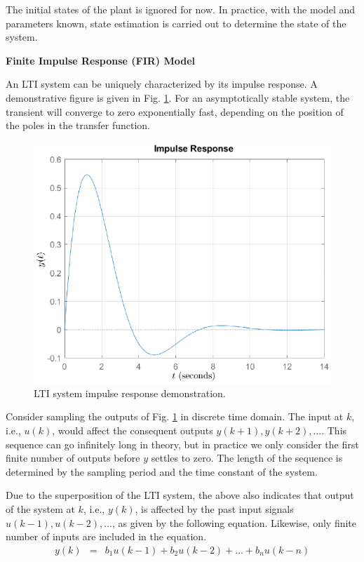 The initial states of the plant is ignored for now. In practice, with the model and parameters known, state estimation is carried out to determine the state of the system.

\vspace{0.1in}
\noindent \textbf{Finite Impulse Response (FIR) Model}
\vspace{0.1in}

An LTI system can be uniquely characterized by its impulse response. A demonstrative figure is given in Fig. \ref{ch:acs:fig:impulse_second_demo}. For an asymptotically stable system, the transient will converge to zero exponentially fast, depending on the position of the poles in the transfer function.
\begin{figure}
	\centering
	\includegraphics[width=350pt]{chapters/ch-adaptive-control-system/figures/impulse_second_demo.eps}
	\caption{LTI system impulse response demonstration.} \label{ch:acs:fig:impulse_second_demo}
\end{figure}

Consider sampling the outputs of Fig. \ref{ch:acs:fig:impulse_second_demo} in discrete time domain. The input at $k$, i.e., $u(k)$, would affect the consequent outputs $y(k+1), y(k+2), ...$. This sequence can go infinitely long in theory, but in practice we only consider the first finite number of outputs before $y$ settles to zero. The length of the sequence is determined by the sampling period and the time constant of the system.

Due to the superposition of the LTI system, the above also indicates that output of the system at $k$, i.e., $y(k)$, is affected by the past input signals $u(k-1), u(k-2), ...$, as given by the following equation. Likewise, only finite number of inputs are included in the equation.
\begin{eqnarray}
	y(k) &=& b_1u(k-1) + b_2u(k-2) + \ldots + b_nu(k-n) \label{eq:firmodel}
\end{eqnarray}

